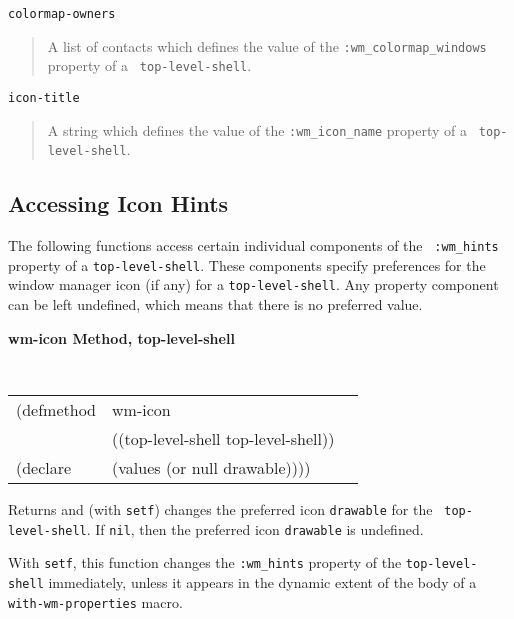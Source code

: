 \begin{flushright} \parbox[t]{6.125in}{
{\tt colormap-owners}
\begin{quote}
A list of contacts which defines the value of the
{\tt :wm\_colormap\_windows} property of a {\tt
top-level-shell}. 
\end{quote}

}\end{flushright}

\begin{flushright} \parbox[t]{6.125in}{
{\tt icon-title}
\begin{quote}
A string which defines the value of the
{\tt :wm\_icon\_name} property of a {\tt
top-level-shell}. 
\end{quote}

}\end{flushright}


{\samepage
\subsection*{Accessing Icon Hints} 

The following functions access certain individual components of the {\tt
:wm\_hints} property of a {\tt top\--level\--shell}. These components specify preferences
for the window manager icon (if any) for a {\tt top-level-shell}. Any property component
can be left undefined, which means that there is no preferred value.
}

{\samepage
{\large {\bf wm-icon \hfill Method, top-level-shell}}
\begin{flushright} \parbox[t]{6.125in}{
\tt
\begin{tabular}{lll}
\raggedright
(defmethod & wm-icon & \\
           & ((top-level-shell  top-level-shell)) \\
(declare   & (values (or null drawable))))
\end{tabular}
\rm

}\end{flushright}}

\begin{flushright} \parbox[t]{6.125in}{
Returns and (with {\tt setf}) changes the preferred icon {\tt drawable}
for the {\tt
top-level-shell}. If {\tt nil}, then the preferred icon {\tt drawable} is undefined.

With {\tt setf}, this function changes the {\tt :wm\_hints} property of
the {\tt top-level-shell} immediately, unless it appears in the dynamic extent of the
body of a {\tt with-wm-properties} macro.


}\end{flushright}

